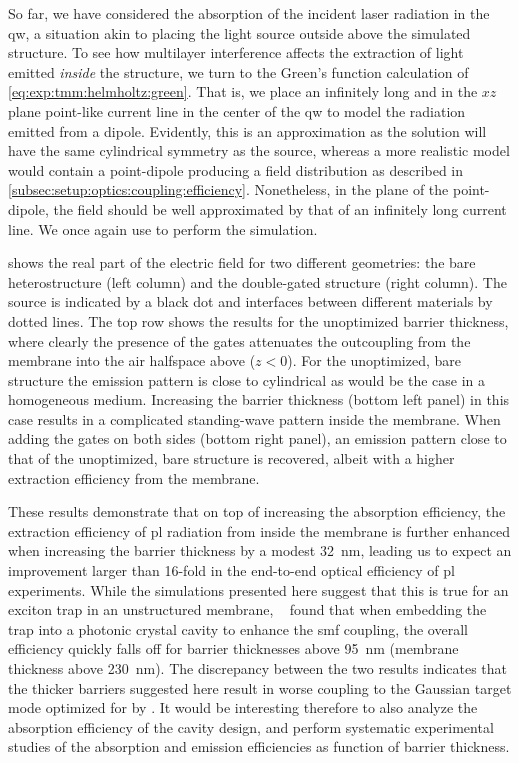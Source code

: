 So far, we have considered the absorption of the incident laser radiation in the \gls{qw}, a situation akin to placing the light source outside above the simulated structure.
To see how multilayer interference affects the extraction of light emitted \emph{inside} the structure, we turn to the Green's function calculation of \cref{eq:exp:tmm:helmholtz:green}.
That is, we place an infinitely long and in the $xz$ plane point-like current line in the center of the \gls{qw} to model the radiation emitted from a dipole.
Evidently, this is an approximation as the solution will have the same cylindrical symmetry as the source, whereas a more realistic model would contain a point-dipole producing a field distribution as described in \cref{subsec:setup:optics:coupling:efficiency}.
Nonetheless, in the plane of the point-dipole, the field should be well approximated by that of an infinitely long current line.
We once again use \pymoosh to perform the simulation.

 shows the real part of the electric field for two different geometries: the bare heterostructure (left column) and the double-gated structure (right column).
The source is indicated by a black dot and interfaces between different materials by dotted lines.
The top row shows the results for the unoptimized barrier thickness, where clearly the presence of the gates attenuates the outcoupling from the membrane into the air halfspace above ($z < 0$).
For the unoptimized, bare structure the emission pattern is close to cylindrical as would be the case in a homogeneous medium.
Increasing the barrier thickness (bottom left panel) in this case results in a complicated standing-wave pattern inside the membrane.
When adding the gates on both sides (bottom right panel), an emission pattern close to that of the unoptimized, bare structure is recovered, albeit with a higher extraction efficiency from the membrane.

These results demonstrate that on top of increasing the absorption efficiency, the extraction efficiency of \gls{pl} radiation from inside the membrane is further enhanced when increasing the  barrier thickness by a modest \qty{32}{\nano\meter}, leading us to expect an improvement larger than 16-fold in the end-to-end optical efficiency of \gls{pl} experiments.
While the simulations presented here suggest that this is true for an exciton trap in an unstructured membrane, \citeauthor{Wu2020}~\cite{Wu2020,Wu2024} found that when embedding the trap into a photonic crystal cavity to enhance the \acrlong{smf} coupling, the overall efficiency quickly falls off for barrier thicknesses above \qty{95}{\nano\meter} (membrane thickness above \qty{230}{\nano\meter}).
The discrepancy between the two results indicates that the thicker barriers suggested here result in worse coupling to the Gaussian target mode optimized for by \citet{Wu2020}.
It would be interesting therefore to also analyze the absorption efficiency of the cavity design, and perform systematic experimental studies of the absorption and emission efficiencies as function of barrier thickness.
